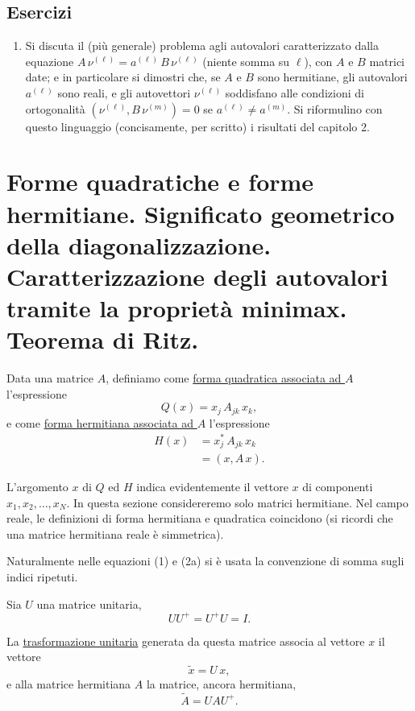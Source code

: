 \documentclass[11pt, a4paper]{book}
\numberwithin{equation}{section}
\newenvironment{esercizi}{\subsection*{Esercizi}\begin{enumerate}}{\end{enumerate}}
\begin{document}
\begin{esercizi}
\item Si discuta il (più generale) problema agli autovalori caratterizzato
dalla equazione $A\,\nu^{(\ell)} = a^{(\ell)}\,B\,\nu^{(\ell)}$ (niente
somma su $\ell$), con $A$ e $B$ matrici date; e in particolare si dimostri
che, se $A$ e $B$ sono hermitiane, gli autovalori $a^{(\ell)}$ sono reali,
e gli autovettori $\nu^{(\ell)}$ soddisfano alle condizioni di ortogonalità
$(\nu^{(\ell)}, B\,\nu^{(m)}) = 0$ se $a^{(\ell)} \neq a^{(m)}$. Si
riformulino con questo linguaggio (concisamente, per scritto) i risultati
del capitolo 2.

\end{esercizi}

\section[forme quadratiche ed hermittiane, minimax, ritz]{Forme quadratiche e forme hermitiane. Significato geometrico
della diagonalizzazione. Caratterizzazione degli autovalori tramite la
proprietà minimax. Teorema di Ritz.}

Data una matrice $A$, definiamo come \underline{forma quadratica associata
ad $A$} l'espressione
\begin{equation}
Q(x) = x_j\,A_{jk}\,x_k,
\end{equation}
e come \underline{forma hermitiana associata ad $A$} l'espressione
\begin{align}
H(x) &= x_j^*\,A_{jk}\,x_k \tag{2a} \\
     &= (x, A\,x). \tag{2b}
\end{align}

L'argomento $x$ di $Q$ ed $H$ indica evidentemente il vettore $x$ di
componenti $x_1, x_2, \ldots, x_N$. In questa sezione considereremo solo
matrici hermitiane. Nel campo reale, le definizioni di forma hermitiana e
quadratica coincidono (si ricordi che una matrice hermitiana reale è
simmetrica).

Naturalmente nelle equazioni (1) e (2a) si è usata la convenzione di somma
sugli indici ripetuti.

Sia $U$ una matrice unitaria,
\begin{equation}
UU^+ = U^+U = I.
\end{equation}

La \underline{trasformazione unitaria} generata da questa matrice associa
al vettore $x$ il vettore
\begin{equation}
\widetilde{x} = U\,x,
\end{equation}
e alla matrice hermitiana $A$ la matrice, ancora hermitiana,
\begin{equation}
\widetilde{A} = UAU^+.
\end{equation}
\end{document}
